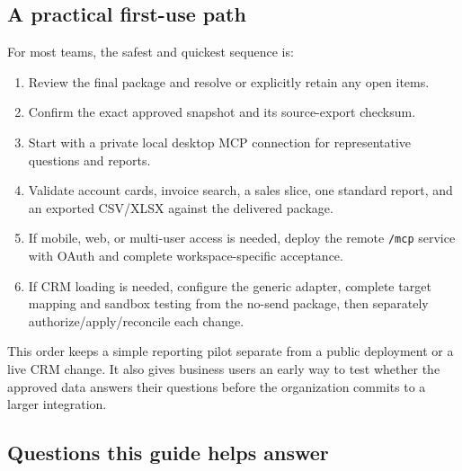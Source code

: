 \documentclass[
]{article}
\providecommand{\tightlist}{%
  \setlength{\itemsep}{0pt}\setlength{\parskip}{0pt}}
\begin{document}
\subsection{A practical first-use
path}\label{a-practical-first-use-path}

For most teams, the safest and quickest sequence is:

\begin{enumerate}
\def\labelenumi{\arabic{enumi}.}
\tightlist
\item
  Review the final package and resolve or explicitly retain any open
  items.
\item
  Confirm the exact approved snapshot and its source-export checksum.
\item
  Start with a private local desktop MCP connection for representative
  questions and reports.
\item
  Validate account cards, invoice search, a sales slice, one standard
  report, and an exported CSV/XLSX against the delivered package.
\item
  If mobile, web, or multi-user access is needed, deploy the remote
  \texttt{/\allowbreak{}mcp} service with OAuth and complete
  workspace-specific acceptance.
\item
  If CRM loading is needed, configure the generic adapter, complete
  target mapping and sandbox testing from the no-send package, then
  separately authorize/apply/reconcile each change.
\end{enumerate}

This order keeps a simple reporting pilot separate from a public
deployment or a live CRM change. It also gives business users an early
way to test whether the approved data answers their questions before the
organization commits to a larger integration.

\subsection{Questions this guide helps
answer}\label{questions-this-guide-helps-answer}
\end{document}
